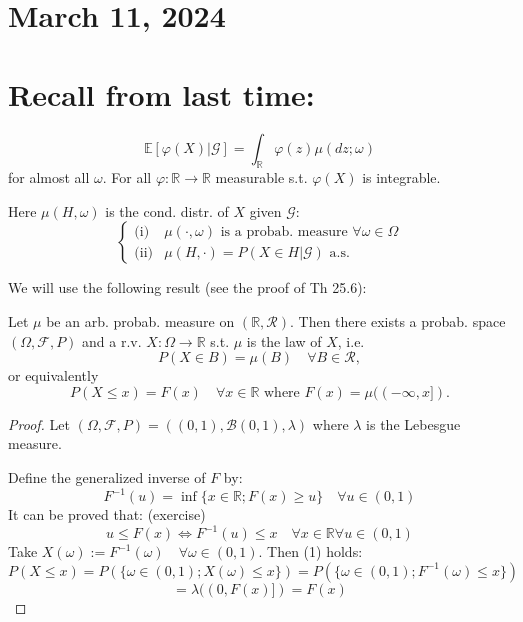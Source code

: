 \newpage
\section{March 11, 2024}

\section*{Recall from last time:}
\begin{theorem}[Theorem 34.5]
\[
\mathbb{E}[\varphi(X)|\mathcal{G}] = \int_{\mathbb{R}} \varphi(z) \mu(dz;\omega)
\]
for almost all \(\omega\). For all \(\varphi : \mathbb{R} \to \mathbb{R}\) measurable s.t. \(\varphi(X)\) is integrable.
\end{theorem}

Here \(\mu(H,\omega)\) is the cond. distr. of \(X\) given \(\mathcal{G}\):
\[
\begin{cases}
\text{(i)} & \mu(\cdot, \omega) \text{ is a probab. measure } \forall \omega \in \Omega \\
\text{(ii)} & \mu(H, \cdot) = P(X \in H | \mathcal{G}) \text{ a.s.}
\end{cases}
\]

We will use the following result (see the proof of Th 25.6):

\begin{lemma}
Let \(\mu\) be an arb. probab. measure on \((\mathbb{R}, \mathcal{R})\). Then there exists a probab. space \((\Omega, \mathcal{F}, P)\) and a r.v. \(X : \Omega \to \mathbb{R}\) s.t. \(\mu\) is the law of \(X\), i.e.
\[
P(X \in B) = \mu(B) \quad \forall B \in \mathcal{R},
\]
or equivalently
\[
P(X \leq x) = F(x) \quad \forall x \in \mathbb{R} \text{ where } F(x) = \mu((-\infty, x]).
\]
\end{lemma}

\begin{proof}
Let \((\Omega, \mathcal{F}, P) = ((0,1), \mathcal{B}(0,1), \lambda)\) where \(\lambda\) is the Lebesgue measure.

Define the generalized inverse of \(F\) by:
\[
F^{-1}(u) = \inf \{ x \in \mathbb{R} ; F(x) \geq u \} \quad \forall u \in (0,1)
\]
It can be proved that: (exercise)
\[
u \leq F(x) \iff F^{-1}(u) \leq x \quad \forall x \in \mathbb{R} \forall u \in (0,1)
\]
Take \(X(\omega) := F^{-1}(\omega) \quad \forall \omega \in (0,1)\). Then (1) holds:
\[
P(X \leq x) = P(\{\omega \in (0,1); X(\omega) \leq x\}) = P(\{\omega \in (0,1); F^{-1}(\omega) \leq x\})
\]
\[
= \lambda((0, F(x)]) = F(x)
\]

\end{proof}

